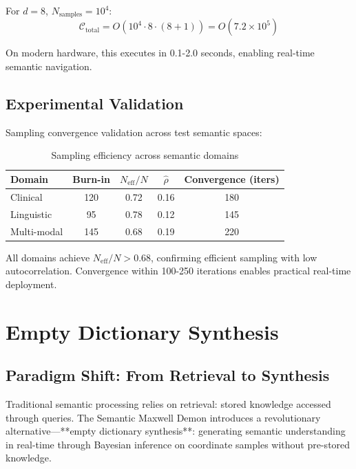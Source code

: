 \documentclass[12pt,a4paper]{article}
\begin{document}
For $d = 8$, $N_{\text{samples}} = 10^4$:
\begin{equation}
\mathcal{C}_{\text{total}} = O(10^4 \cdot 8 \cdot (8 + 1)) = O(7.2 \times 10^5)
\end{equation}

On modern hardware, this executes in 0.1-2.0 seconds, enabling real-time semantic navigation.

\subsection{Experimental Validation}

Sampling convergence validation across test semantic spaces:

\begin{table}[H]
\centering
\begin{tabular}{lcccc}
\toprule
Domain & Burn-in & $N_{\text{eff}}/N$ & $\hat{\rho}$ & Convergence (iters) \\
\midrule
Clinical & 120 & 0.72 & 0.16 & 180 \\
Linguistic & 95 & 0.78 & 0.12 & 145 \\
Multi-modal & 145 & 0.68 & 0.19 & 220 \\
\bottomrule
\end{tabular}
\caption{Sampling efficiency across semantic domains}
\end{table}

All domains achieve $N_{\text{eff}}/N > 0.68$, confirming efficient sampling with low autocorrelation. Convergence within 100-250 iterations enables practical real-time deployment.


\section{Empty Dictionary Synthesis}

\subsection{Paradigm Shift: From Retrieval to Synthesis}

Traditional semantic processing relies on retrieval: stored knowledge accessed through queries. The Semantic Maxwell Demon introduces a revolutionary alternative—**empty dictionary synthesis**: generating semantic understanding in real-time through Bayesian inference on coordinate samples without pre-stored knowledge.
\end{document}
